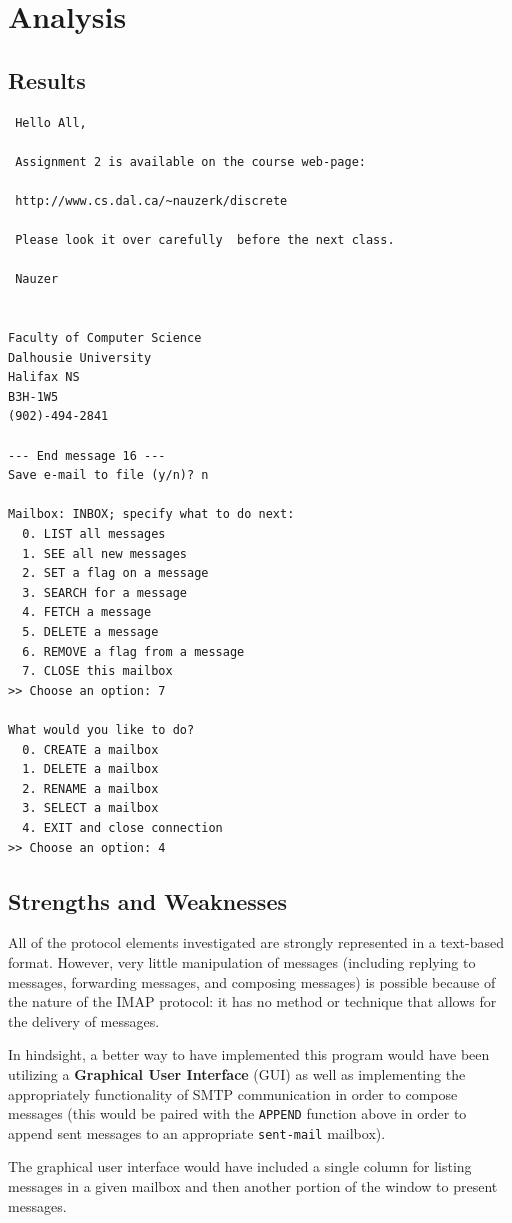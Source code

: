 \documentclass{article}
\newcommand{\enterSectionHeader}[1]{
\nobreak\extramarks{}{}\nobreak
\nobreak\extramarks{}{}\nobreak
}
\newcounter{docSectionCounter} %
\newcommand{\docSectionName}{}
\newenvironment{docSection}[1][Section \arabic{docSectionCounter}]{ %
\stepcounter{docSectionCounter} %
\renewcommand{\docSectionName}{#1} %
\section{\docSectionName} %
\enterSectionHeader{\docSectionName} %
}{
}
\newcommand{\docSubsectionName}{}
\newenvironment{docSubsection}[1]{ %
\renewcommand{\docSubsectionName}{#1} %
\subsection{\docSubsectionName} %
\enterSectionHeader{\docSubsectionName} %
}{
\enterSectionHeader{\docSectionName} %
}
\begin{document}
\begin{docSection}[Analysis]
\begin{docSubsection}{Results}
\begin{verbatim}
 Hello All,

 Assignment 2 is available on the course web-page:

 http://www.cs.dal.ca/~nauzerk/discrete

 Please look it over carefully  before the next class.

 Nauzer


Faculty of Computer Science
Dalhousie University
Halifax NS
B3H-1W5
(902)-494-2841

--- End message 16 ---
Save e-mail to file (y/n)? n

Mailbox: INBOX; specify what to do next:
  0. LIST all messages
  1. SEE all new messages
  2. SET a flag on a message
  3. SEARCH for a message
  4. FETCH a message
  5. DELETE a message
  6. REMOVE a flag from a message
  7. CLOSE this mailbox
>> Choose an option: 7

What would you like to do?
  0. CREATE a mailbox
  1. DELETE a mailbox
  2. RENAME a mailbox
  3. SELECT a mailbox
  4. EXIT and close connection
>> Choose an option: 4
\end{verbatim}

\end{docSubsection}
\begin{docSubsection}{Strengths and Weaknesses}
All of the protocol elements investigated are strongly represented in a text-based format. However, very little manipulation of messages (including replying to messages, forwarding messages, and composing messages) is possible because of the nature of the IMAP protocol: it has no method or technique that allows for the delivery of messages.

In hindsight, a better way to have implemented this program would have been utilizing a \textbf{Graphical User Interface} (GUI) as well as implementing the appropriately functionality of SMTP communication in order to compose messages (this would be paired with the \texttt{APPEND} function above in order to append sent messages to an appropriate \texttt{sent-mail} mailbox).

The graphical user interface would have included a single column for listing messages in a given mailbox and then another portion of the window to present messages.
\end{docSubsection}


\end{docSection}
\end{document}
